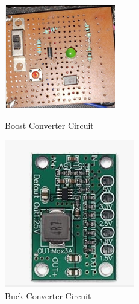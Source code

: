\documentclass[12pt,a4paper]{report}
\begin{document}
\begin{enumerate}
\begin{itemize}
        
\begin{figure}[H]
    \centering
    \begin{minipage}{0.45\textwidth}
        \centering
        \includegraphics[width=\textwidth]{powerCircuit}  %
        \caption{Boost Converter Circuit}
        \label{fig:powerCircuit}
    \end{minipage} \hfill
    \begin{minipage}{0.45\textwidth}
        \centering
        \includegraphics[width=\textwidth]{buckConverter}  %
        \caption{Buck Converter Circuit}
        \label{fig:buckConverter}
    \end{minipage}
\end{figure}        
        

\end{itemize}
\end{enumerate}
\end{document}
